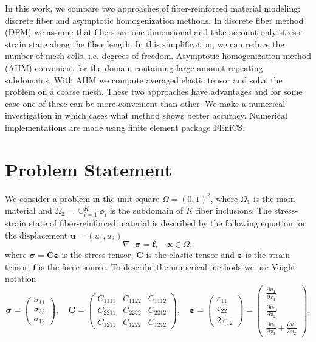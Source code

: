 \documentclass[a4paper]{jpconf}
\begin{document}
In this work, we compare two approaches of fiber-reinforced material modeling: discrete fiber and asymptotic homogenization methods. In discrete fiber method (DFM) we assume that fibers are one-dimensional and take account only stress-strain state along the fiber length. In this simplification, we can reduce the number of mesh cells, i.e. degrees of freedom. Asymptotic homogenization method (AHM)\cite{pinho-da-crus2009asymptotic,oliveira2009asymptotic,pellegrino1999numerical,yuan2008toward} convenient for the domain containing large amount repeating subdomains. With AHM we compute averaged elastic tensor and solve the problem on a coarse mesh. These two approaches have advantages and for some case one of these can be more convenient than other. We make a numerical investigation in which cases what method shows better accuracy. Numerical implementations are made using finite element package FEniCS\cite{fenics2012}.

\section{Problem Statement} 

We consider a problem in the unit square $\Omega=(0,1)^2$, where $\Omega_1$ is the main material and $\Omega_2=\cup_{i=1}^K \phi_i$ is the subdomain of $K$ fiber inclusions.
The stress-strain state of fiber-reinforced material is described by the following equation for the displacement $\bm{u}=(u_1, u_2)$
\begin{equation}
\nabla \cdot \bm{\sigma} = \bm{f}, \quad \bm{x} \in \Omega,
\label{eq:displacement}
\end{equation}
where $\bm{\sigma}=\bm{C}\bm{\varepsilon}$ is the stress tensor, $\bm{C}$ is the elastic tensor and $\bm{\varepsilon}$ is the strain tensor, $\bm{f}$ is the force source.
To describe the numerical methods we use Voight notation
\[
\bm{\sigma} = \left(
\begin{matrix}\sigma_{11}\\ \sigma_{22}\\ \sigma_{12}\end{matrix}
\right), \quad
\bm{C} = \left( \begin{matrix}
C_{1111} & C_{1122} & C_{1112}  \\
C_{2211} & C_{2222} & C_{2212}  \\
C_{1211} & C_{1222} & C_{1212}  
\end{matrix}  \right), \quad
\bm{\varepsilon} = \left(
\begin{matrix}\varepsilon_{11}\\ \varepsilon_{22}\\ 2\, \varepsilon_{12}\end{matrix}
\right) = \left( \begin{matrix}\frac{\partial u_1}{\partial x_1}\\ \frac{\partial u_2}{\partial x_2} \\ \frac{\partial u_2}{\partial x_1} + \frac{\partial u_1}{\partial x_2} \end{matrix} \right).
\]
\end{document}
